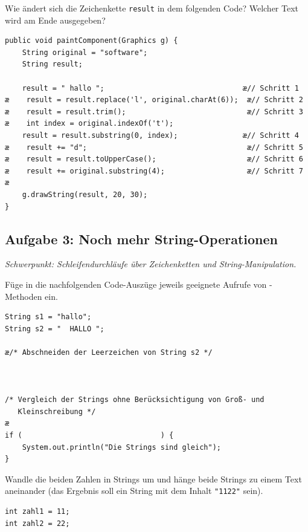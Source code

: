 Wie ändert sich die Zeichenkette \lstinline|result| in dem folgenden Code?
Welcher Text wird am Ende ausgegeben?

\begin{lstlisting}
public void paintComponent(Graphics g) {
    String original = "software";
    String result;

    result = " hallo ";                                æ// Schritt 1
æ    result = result.replace('l', original.charAt(6));  æ// Schritt 2
æ    result = result.trim();                            æ// Schritt 3
æ    int index = original.indexOf('t');
    result = result.substring(0, index);               æ// Schritt 4
æ    result += "d";                                     æ// Schritt 5
æ    result = result.toUpperCase();                     æ// Schritt 6
æ    result += original.substring(4);                   æ// Schritt 7
æ
    g.drawString(result, 20, 30);
}
\end{lstlisting}


\subsection{Aufgabe 3: Noch mehr String-Operationen \tagZusatz}
\noindent \emph{Schwerpunkt: Schleifendurchläufe über Zeichenketten und String-Manipulation.}

Füge in die nachfolgenden Code-Auszüge jeweils geeignete Aufrufe von
-Methoden ein.

\begin{compactenum}[a)]
\item
\begin{lstlisting}
String s1 = "hallo";
String s2 = "  HALLO ";

æ/* Abschneiden der Leerzeichen von String s2 */



/* Vergleich der Strings ohne Berücksichtigung von Groß- und    
   Kleinschreibung */
æ
if (								) {
    System.out.println("Die Strings sind gleich");
}
\end{lstlisting}

\item Wandle die beiden Zahlen in Strings um und hänge beide Strings zu
einem Text aneinander (das Ergebnis soll ein String mit dem Inhalt \texttt{"1122"} sein). 
\begin{lstlisting}
int zahl1 = 11;
int zahl2 = 22;
\end{lstlisting}
\end{compactenum}


